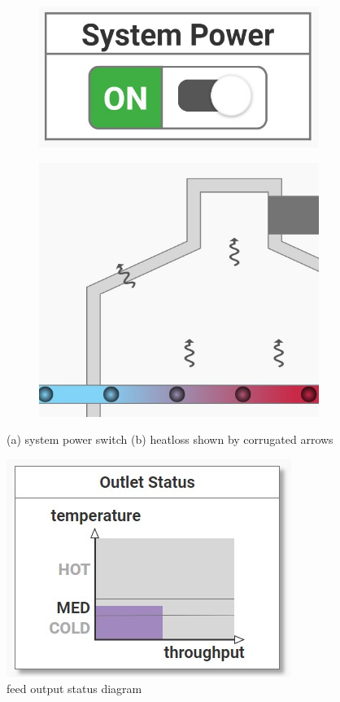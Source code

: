 \begin{figure}[htp]
    \centering
    \begin{subfigure}{0.5\textwidth}
        \centering
        \includegraphics[width=0.6\linewidth]{images/concept/elements/system_power.jpg}
        \caption{}
    \end{subfigure}%
    \begin{subfigure}{0.5\textwidth}
        \centering
        \includegraphics[width=0.7\linewidth]{images/concept/elements/arrow_heatloss.jpg}
        \caption{}
    \end{subfigure}
    \caption { (a) system power switch (b) heatloss shown by corrugated arrows}
\label{fig:appendix_heat_loss_systempower}
\end{figure}

\begin{figure}[htp]
    \centering
    \includegraphics[width=0.5\linewidth]{images/concept/elements/feed_output.jpg}
    \caption {feed output status diagram}
\label{fig:feed_output}
\end{figure}

